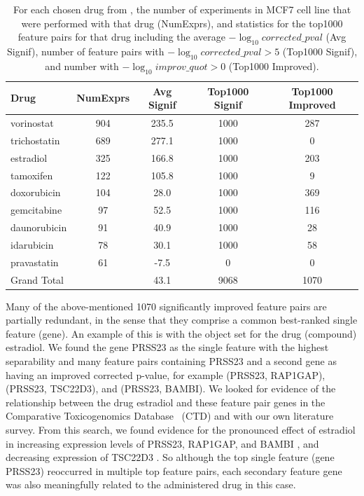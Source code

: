 \begin{table}[t!]
\centering
\small
\begin{tabular}{|l|c|c|c|c|}
\hline
 Drug & NumExprs & Avg Signif & Top1000 Signif & Top1000 Improved\\
\hline
vorinostat & 904 & 235.5 & 1000 & 287\\
\hline
trichostatin & 689 & 277.1 & 1000 & 0\\
\hline
estradiol & 325 & 166.8 & 1000 & 203\\
\hline
tamoxifen & 122 & 105.8 & 1000 & 9\\
\hline
doxorubicin & 104 & 28.0 & 1000 & 369\\
\hline
gemcitabine & 97 & 52.5 & 1000 & 116\\
\hline
daunorubicin & 91 & 40.9 & 1000 & 28\\
\hline
idarubicin & 78 & 30.1 & 1000 & 58\\
\hline
pravastatin & 61 & -7.5 & 0 & 0\\
\hline
Grand Total & & 43.1 & 9068 & 1070\\
\hline
 \end{tabular}
\caption{For each chosen drug from \lincs, the number of experiments in MCF7 cell line that were performed with that drug (NumExprs), and statistics for the top1000 feature pairs for that drug including the average $-\log_{10} corrected\_pval$ (Avg Signif), number of feature pairs with $-\log_{10} corrected\_pval > 5$ (Top1000 Signif), and number with $-\log_{10} improv\_quot > 0$ (Top1000 Improved).}
\label{tbl:selected_fps}
\vspace{-18pt}
\end{table}


Many of the above-mentioned 1070 significantly improved feature pairs are partially redundant, in the sense that they comprise a common best-ranked single feature (gene). An example of this is with the object set for the drug (compound) estradiol. We found the gene PRSS23 as the single feature with the highest separability and many feature pairs containing PRSS23 and a second gene as having an improved corrected p-value, for example (PRSS23, RAP1GAP), (PRSS23, TSC22D3), and (PRSS23, BAMBI). We looked for evidence of the relationship between the drug estradiol and these feature pair genes in the Comparative Toxicogenomics Database~\cite{grondin2018accessing} (CTD) and with our own literature survey. From this search, we found evidence for the pronounced effect of estradiol in increasing expression levels of PRSS23, RAP1GAP, and BAMBI , and decreasing expression of TSC22D3 . So although the top single feature (gene PRSS23) reoccurred in multiple top feature pairs, each secondary feature gene was also meaningfully related to the administered drug in this case.

